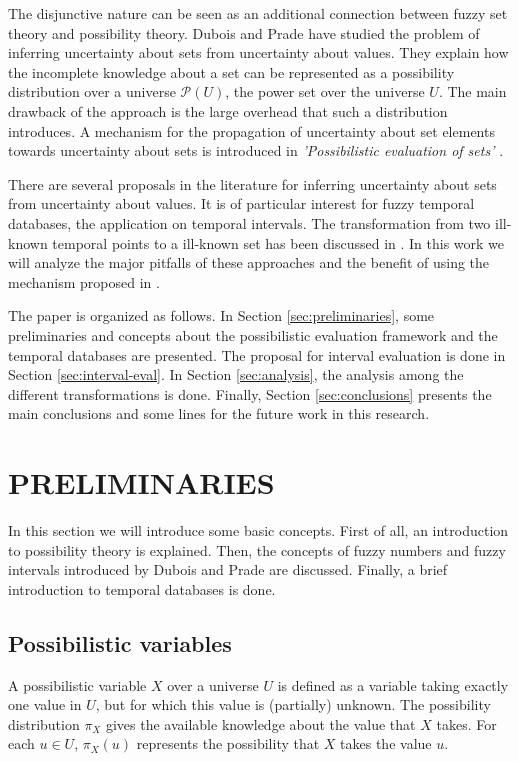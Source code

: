 \documentclass[twoside,twocolumn,a4paper]{article}
\newcommand{\Pow}{\mathcal{P}}
\begin{document}
The disjunctive nature can be seen as an additional connection between fuzzy set theory and possibility theory. Dubois and Prade \cite{Dubois88b} have studied the problem of inferring uncertainty about sets from uncertainty about values. They explain how the incomplete knowledge about a set can be represented as a possibility distribution over a universe $\Pow \left(U \right)$, the power set over the universe $U$. The main drawback of the approach is the large overhead that such a distribution introduces.  A mechanism for the propagation of uncertainty about set elements towards uncertainty about sets is introduced in \textit{'Possibilistic evaluation of sets'} \cite{Pon11}.

There are several proposals in the literature for inferring uncertainty about sets from uncertainty about values. It is of particular interest for fuzzy temporal databases, the application on temporal intervals. The transformation from two ill-known temporal points to a ill-known set has been discussed in \cite{Garrido2009}. In this work we will analyze the major pitfalls of these approaches and the benefit of using the mechanism proposed in \cite{Pon11}.

The paper is organized as follows. In Section \ref{sec:preliminaries}, some preliminaries and concepts about the possibilistic evaluation framework and the temporal databases are presented. The proposal for interval evaluation is done in Section \ref{sec:interval-eval}. In Section \ref{sec:analysis}, the analysis among the different transformations is done. Finally, Section \ref{sec:conclusions} presents the main conclusions and some lines for the future work in this research.


\section{\label{sec:preliminaries}PRELIMINARIES}
In this section we will introduce some basic concepts. First of all, an introduction to possibility theory is explained. Then, the concepts of fuzzy numbers and fuzzy intervals introduced by Dubois and Prade \cite{Dubois1983} are discussed. Finally, a brief introduction to temporal databases is done.

\subsection{\label{subsec:possibilistic-variables}Possibilistic variables}
A possibilistic variable $X$ over a universe $U$ is defined as a variable taking exactly one value in $U$, but for which this value is (partially) unknown. The possibility distribution $\pi_X$ gives the available knowledge about the value that $X$ takes. For each $u\in U$, $\pi_X(u)$ represents the possibility that $X$ takes the value $u$.
\end{document}
